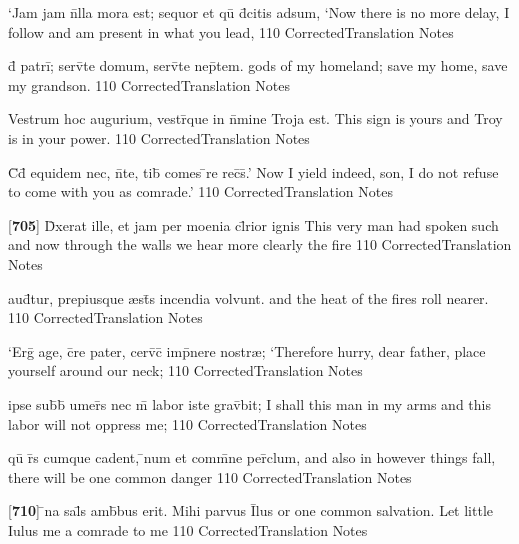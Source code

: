 \latline
  {`Jam jam n\={}lla mora est; sequor et qu\={} d\={}citis adsum,}
  { `Now there is no more delay, I follow and am present in what you lead, }
  {110}
  { CorrectedTranslation }
  { Notes }


\latline
  {d\={\macron {\i}} patri\={\macron {\i}}; serv\={}te domum, serv\={}te nep\={}tem.}
  { gods of my homeland; save my home, save my grandson. }
  {110}
  { CorrectedTranslation }
  { Notes }


\latline
  {Vestrum hoc augurium, vestr\={}que in n\={}mine Troja est.}
  { This sign is yours and Troy is in your power. }
  {110}
  { CorrectedTranslation }
  { Notes }


\latline
  {C\={}d\={} equidem nec, n\={}te, tib\={\macron {\i}} comes \={\macron {\i}}re rec\={}s\={}.'}
  { Now I yield indeed, son, I do not refuse to come with you as comrade.' }
  {110}
  { CorrectedTranslation }
  { Notes }


\latline
  {[\textbf{705}] D\={\macron {\i}}xerat ille, et jam per moenia cl\={}rior ignis}
  { This very man had spoken such and now through the walls we hear more clearly the fire }
  {110}
  { CorrectedTranslation }
  { Notes }


\latline
  {aud\={\macron {\i}}tur, prepiusque {\ae}st\={}s incendia volvunt.}
  { and the heat of the fires roll nearer. }
  {110}
  { CorrectedTranslation }
  { Notes }


\latline
  {`Erg\={} age, c\={}re pater, cerv\={\macron {\i}}c\={\macron {\i}} imp\={}nere nostr{\ae};}
  { `Therefore hurry, dear father, place yourself around our neck; }
  {110}
  { CorrectedTranslation }
  { Notes }


\latline
  {ipse sub\={\macron {\i}}b\={} umer\={\macron {\i}}s nec m\={} labor iste grav\={}bit;}
  { I shall this man in my arms and this labor will not oppress me;  }
  {110}
  { CorrectedTranslation }
  { Notes }


\latline
  {qu\={} r\={}s cumque cadent, \={}num et comm\={}ne per\={\macron {\i}}clum,}
  { and also in however things fall, there will be one common danger }
  {110}
  { CorrectedTranslation }
  { Notes }


\latline
  {[\textbf{710}] \={}na sal\={}s amb\={}bus erit.  Mihi parvus I\={}lus}
  { or one common salvation.  Let little Iulus me a comrade to me }
  {110}
  { CorrectedTranslation }
  { Notes }


